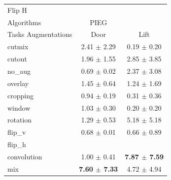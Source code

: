 \begin{tabular}{lcc}
Flip H & & \\
Algorithms & PIEG & \\
Tasks Augmentations & Door & Lift \\
cutmix          & 2.41 $\pm$ 2.29 & 0.19 $\pm$ 0.20 \\
cutout          & 1.96 $\pm$ 1.55 & 2.85 $\pm$ 3.85 \\
no\_aug         & 0.69 $\pm$ 0.02 & 2.37 $\pm$ 3.08 \\
overlay         & 1.45 $\pm$ 0.64 & 1.24 $\pm$ 1.69 \\
cropping        & 0.94 $\pm$ 0.19 & 0.31 $\pm$ 0.36 \\
window          & 1.03 $\pm$ 0.30 & 0.20 $\pm$ 0.20 \\
rotation        & 1.29 $\pm$ 0.53 & 5.18 $\pm$ 5.18 \\
flip\_v         & 0.68 $\pm$ 0.01 & 0.66 $\pm$ 0.89 \\
flip\_h         &  &  \\
convolution     & 1.00 $\pm$ 0.41 & \textbf{7.87 $\pm$ 7.59} \\
mix             & \textbf{7.60 $\pm$ 7.33} & 4.72 $\pm$ 4.94 \\
\end{tabular}